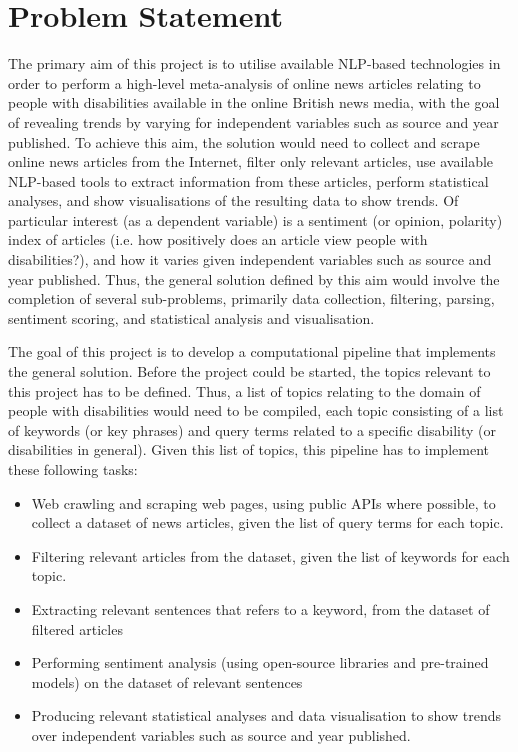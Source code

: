 \documentclass{report}
\begin{document}
\section{Problem Statement} \label{Problem Statement}

The primary aim of this project is to utilise available NLP-based technologies in order to perform a high-level meta-analysis of online news articles relating to people with disabilities available in the online British news media, with the goal of revealing trends by varying for independent variables such as source and year published.
To achieve this aim, the solution would need to collect and scrape online news articles from the Internet, filter only relevant articles, use available NLP-based tools to extract information from these articles, perform statistical analyses, and show visualisations of the resulting data to show trends.
Of particular interest (as a dependent variable) is a sentiment (or opinion, polarity) index of articles (i.e. how positively does an article view people with disabilities?), and how it varies given independent variables such as source and year published.
Thus, the general solution defined by this aim would involve the completion of several sub-problems, primarily data collection, filtering, parsing, sentiment scoring, and statistical analysis and visualisation.

The goal of this project is to develop a computational pipeline that implements the general solution.
Before the project could be started, the topics relevant to this project has to be defined.
Thus, a list of topics relating to the domain of people with disabilities would need to be compiled, each topic consisting of a list of keywords (or key phrases) and query terms related to a specific disability (or disabilities in general).
Given this list of topics, this pipeline has to implement these following tasks:
\begin{itemize}
	\item Web crawling and scraping web pages, using public APIs where possible, to collect a dataset of news articles, given the list of query terms for each topic.
	\item Filtering relevant articles from the dataset, given the list of keywords for each topic.
	\item Extracting relevant sentences that refers to a keyword, from the dataset of filtered articles
	\item Performing sentiment analysis (using open-source libraries and pre-trained models) on the dataset of relevant sentences
	\item Producing relevant statistical analyses and data visualisation to show trends over independent variables such as source and year published.
\end{itemize}
\end{document}
